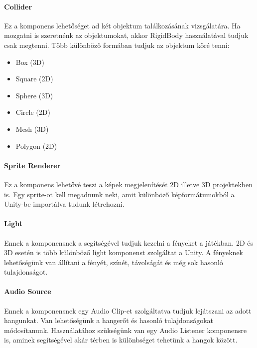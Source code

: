 \documentclass[]{thesis-ekf}
\theoremstyle{definition}
\theoremstyle{remark}
\begin{document}
\paragraph{Collider}

Ez a komponens lehetőséget ad két objektum találkozásának vizsgálatára. Ha mozgatni is szeretnénk az objektumokat, akkor RigidBody használatával tudjuk csak megtenni. Több különböző formában tudjuk az objektum köré tenni: \cite{UnityCollider}

\begin{itemize}
	\item Box (3D)
	\item Square (2D)
	\item Sphere (3D)
	\item Circle (2D)
	\item Mesh (3D)
	\item Polygon (2D)
\end{itemize}

\paragraph{Sprite Renderer}

Ez a komponens lehetővé teszi a képek megjelenítését 2D illetve 3D projektekben is. Egy sprite-ot kell megadnunk neki, amit különböző képformátumokból a Unity-be importálva tudunk létrehozni. \cite{UnitySpriteRenderer}

\paragraph{Light}

Ennek a komponensnek a segítségével tudjuk kezelni a fényeket a játékban. 2D és 3D esetén is több különböző light komponenst szolgáltat a Unity. A fényeknek lehetőségünk van állítani a fényét, színét, távolságát és még sok hasonló tulajdonságot. \cite{UnityLight}

\paragraph{Audio Source}

Ennek a komponensnek egy Audio Clip-et szolgáltatva tudjuk lejátszani az adott hangunkat. Van lehetőségünk a hangerőt és hasonló tulajdonságokat módosítanunk. Használatához szükségünk van egy Audio Listener komponensre is, aminek segítségével akár térben is különbséget tehetünk a hangok között. \cite{UnityAudioSource}
\end{document}
